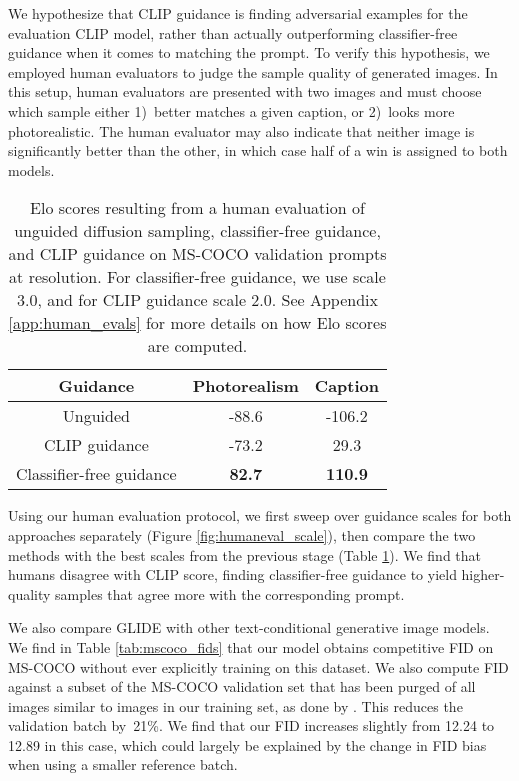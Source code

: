 \documentclass{article}
\newcommand{\modelname}{GLIDE}
\begin{document}
We hypothesize that CLIP guidance is finding adversarial examples for the evaluation CLIP model, rather than actually outperforming classifier-free guidance when it comes to matching the prompt. To verify this hypothesis, we employed human evaluators to judge the sample quality of generated images. In this setup, human evaluators are presented with two  images and must choose which sample either 1)~better matches a given caption, or 2)~looks more photorealistic. The human evaluator may also indicate that neither image is significantly better than the other, in which case half of a win is assigned to both models.

\begin{table}[t]
    \caption{Elo scores resulting from a human evaluation of unguided diffusion sampling, classifier-free guidance, and CLIP guidance on MS-COCO validation prompts at  resolution. For classifier-free guidance, we use scale 3.0, and for CLIP guidance scale 2.0. See Appendix \ref{app:human_evals} for more details on how Elo scores are computed.}
    \label{tab:humaneval_guidance}
    \vskip 0.15in
    \centering
    \begin{center}
    \begin{small}
    \begin{tabular}{ccc}
    \toprule
    Guidance & Photorealism & Caption \\
    \midrule
    Unguided & -88.6 & -106.2 \\
    CLIP guidance & -73.2 & 29.3 \\
    Classifier-free guidance & \bf 82.7 & \bf 110.9 \\
    \bottomrule
    \end{tabular}
    \end{small}
    \end{center}
    \vskip -0.2in
\end{table}

Using our human evaluation protocol, we first sweep over guidance scales for both approaches separately (Figure \ref{fig:humaneval_scale}), then compare the two methods with the best scales from the previous stage (Table \ref{tab:humaneval_guidance}). We find that humans disagree with CLIP score, finding classifier-free guidance to yield higher-quality samples that agree more with the corresponding prompt.

We also compare \modelname{} with other text-conditional generative image models. We find in Table \ref{tab:mscoco_fids} that our model obtains competitive FID on MS-COCO without ever explicitly training on this dataset. We also compute FID against a subset of the MS-COCO validation set that has been purged of all images similar to images in our training set, as done by \citet{dalle}. This reduces the validation batch by~21\%. We find that our FID increases slightly from 12.24 to 12.89 in this case, which could largely be explained by the change in FID bias when using a smaller reference batch.
\end{document}
